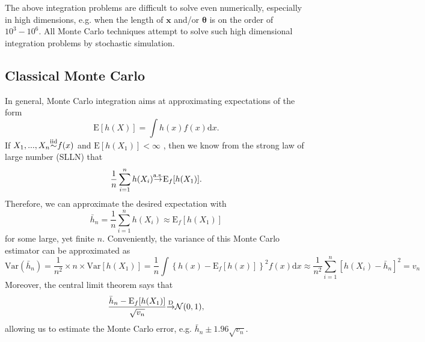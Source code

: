 \documentclass[11pt]{article}\usepackage[]{graphicx}\usepackage[]{color}
\numberwithin{algorithm}{section}
\theoremstyle{remark}
\theoremstyle{definition}
\begin{document}
The above integration problems are difficult to solve even numerically, especially in high dimensions,
e.g. when the length of $\mathbf{x}$ and/or $\boldsymbol{\theta}$ is on the order of $10^3-10^6$.
All Monte Carlo techniques attempt to solve such high dimensional integration problems by stochastic 
simulation. 


\subsection{Classical Monte Carlo}
In general, Monte Carlo integration aims at approximating expectations 
of the form
\begin{equation}
  \text{E}[h(X)] = \int h(x) f(x) \text{d}x.
  \label{gen-int}
\end{equation}
If $X_1,...,X_n {\buildrel \text{iid} \over \sim} f(x)$ and $\text{E}[h(X_1)] < \infty$ , 
then we know from the strong law of large number (SLLN) that 
\begin{equation*}
  \frac{1}{n} \sum_{i =
    1}^ n h(X_i) {\buildrel \text{a.s.} \over \rightarrow} \text{E}_f[h(X_1)].
\end{equation*}
Therefore, we can approximate the desired expectation with 
\begin{equation*}
  \bar{h}_n = \frac{1}{n} \sum_{i=1}^ n h(X_i) \approx \text{E}_f[h(X_1)]
\end{equation*}
for some large, yet finite $n$. Conveniently, the variance of this Monte Carlo estimator can be approximated
as 
\begin{equation*}
  \text{Var}(\bar{h}_n) = \frac{1}{n^2} \times n \times \text{Var}[h(X_1)] = 
  \frac{1}{n} \int \left\{h(x) - \text{E}_{f}[h(x)]\right\}^2 f(x) \text{d}x 
  \approx \frac{1}{n^2} \sum_{i=1}^n \left[h(X_i) - \bar{h}_n\right]^2 = v_n
\end{equation*}
Moreover, the central limit theorem says that
\begin{equation*}
  \frac{\bar{h}_n - \text{E}_f[h(X_1)]}{\sqrt{v_n}} 
  {\buildrel \text{D} \over \rightarrow}  \mathcal{N}(0,1),
\end{equation*}
allowing us to estimate the Monte Carlo error, e.g. $\bar{h}_n \pm 1.96 \sqrt{v_n}$.
\end{document}

